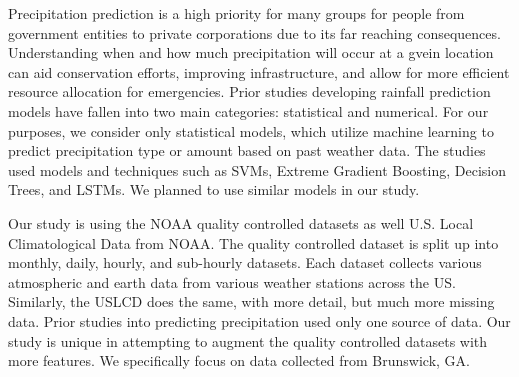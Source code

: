 \documentclass[../report.tex]{subfiles}
\begin{document}
Precipitation prediction is a high priority for many groups for people from government entities to private corporations due to its far reaching consequences. Understanding when and how much precipitation will occur at a gvein location can aid conservation efforts, improving infrastructure, and allow for more efficient resource allocation for emergencies. Prior studies developing rainfall prediction models have fallen into two main categories: statistical and numerical. For our purposes, we consider only statistical models, which utilize machine learning to predict precipitation type or amount based on past weather data. 
The studies used models and techniques such as SVMs, Extreme Gradient Boosting, Decision Trees, and LSTMs. \cite*{liyew_machine_2021,barrera-animas_rainfall_2022,rahman_rainfall_2022}
We planned to use similar models in our study.

Our study is using the NOAA quality controlled datasets \cite*{diamond_us_2013} as well U.S. Local Climatological Data from NOAA\cite*{NOAA_local_1996}.
The quality controlled dataset is split up into monthly, daily, hourly, and sub-hourly datasets.
Each dataset collects various atmospheric and earth data from various weather stations across the US.
Similarly, the USLCD does the same, with more detail, but much more missing data.
Prior studies into predicting precipitation used only one source of data.
Our study is unique in attempting to augment the quality controlled datasets with more features.
We specifically focus on data collected from Brunswick, GA.
\end{document}
